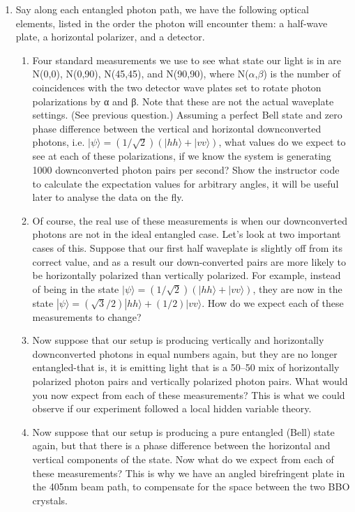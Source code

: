 \documentclass{../signatures}
\begin{document}
\begin{enumerate}
    \item Say along each entangled photon path, we have the following optical elements, listed in the order the photon will encounter them: a half-wave plate, a horizontal polarizer, and a detector.
    \begin{enumerate}
      \item{Four standard measurements we use to see what state our light is in are N(0,0), N(0,90), N(45,45), and N(90,90), where N($\alpha$,$\beta$) is the number of coincidences with the two detector wave plates set to rotate photon polarizations by α and β. Note that these are not the actual waveplate settings. (See previous question.) Assuming a perfect Bell state and zero phase difference between the vertical and horizontal downconverted photons, i.e. $|\psi\rangle=(1/\sqrt{2})(|hh\rangle + |vv\rangle)$, what values do we expect to see at each of these polarizations, if we know the system is generating 1000 downconverted photon pairs per second? Show the instructor code to calculate the expectation values for arbitrary angles, it will be useful later to analyse the data on the fly.}
      \item{Of course, the real use of these measurements is when our downconverted photons are not in the ideal entangled case. Let's look at two important cases of this. Suppose that our first half waveplate is slightly off from its correct value, and as a result our down-converted pairs are more likely to be horizontally polarized than vertically polarized. For example, instead of being in the state $|\psi\rangle=(1/\sqrt{2})(|hh\rangle + |vv\rangle)$, they are now in the state $|\psi\rangle= (\sqrt{3}/2) |hh\rangle + (1/2) |vv\rangle$. How do we expect each of these measurements to change?}
      \item{Now suppose that our setup is producing vertically and horizontally downconverted photons in equal numbers again, but they are no longer entangled-that is, it is emitting light that is a 50–50 mix of horizontally polarized photon pairs and vertically polarized photon pairs. What would you now expect from each of these measurements? This is what we could observe if our experiment followed a local hidden variable theory.}
      \item{Now suppose that our setup is producing a pure entangled (Bell) state again, but that there is a phase difference between the horizontal and vertical components of the state. Now what do we expect from each of these measurements? This is why we have an angled birefringent plate in the 405nm beam path, to compensate for the space between the two BBO crystals.}
    \end{enumerate}


\end{enumerate}
\end{document}
